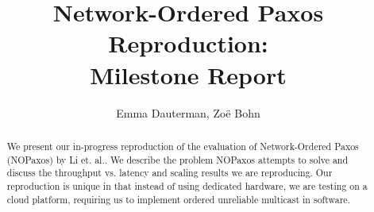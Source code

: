 \documentclass[sigconf]{acmart}
\begin{document}
\title{Network-Ordered Paxos Reproduction: \\Milestone Report}


\author{Emma Dauterman, Zo{\"e} Bohn}

\renewcommand{\shortauthors}{Dauterman, Bohn}

\begin{abstract}
We present our in-progress reproduction of the evaluation of Network-Ordered Paxos \cite{nopaxos} (NOPaxos) by Li et. al.. We describe the problem NOPaxos attempts to solve and discuss the throughput vs. latency and scaling results we are reproducing. Our reproduction is unique in that instead of using dedicated hardware, we are testing on a cloud platform, requiring us to implement ordered unreliable multicast in software.
\end{abstract}

\maketitle





\end{document}
